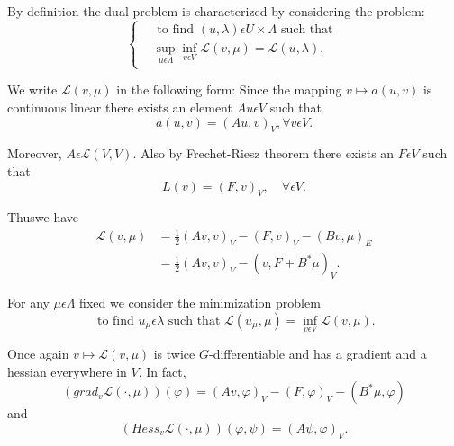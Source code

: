 \medskip
{} By definition the dual problem is characterized by considering the problem:
\begin{equation*}
\begin{cases}
& \text{ to find } (u, \lambda) \epsilon U \times \Lambda \text{ such that }\\
& \sup_{\mu \epsilon \Lambda} \inf_{v \epsilon V} \mathscr{L} (v, \mu) = \mathscr{L}(u, \lambda).\tag{4.13}\label{chap5-eq4.13}
\end{cases}
\end{equation*}

We write $\mathscr{L}(v, \mu)$ in the following form: Since the mapping $v \mapsto a(u, v)$ is continuous linear there exists an element $Au \epsilon V$ such that
$$
a(u, v) = (Au, v)_{V}, \forall v \epsilon V.
$$

Moreover, $A \epsilon \mathscr{L} (V, V)$. Also by Frechet-Riesz theorem there exists an $F \epsilon V$ such that
$$
L(v) = (F, v)_{V}, \quad \forall \epsilon V.
$$

Thus\pageoriginale we have
\begin{align*}
\mathscr{L} (v, \mu) & = \frac{1}{2} (Av, v)_{V} - (F, v)_{V} - (Bv, \mu)_{E}\\
& = \frac{1}{2} (Av, v)_{V} - (v, F + B^{*} \mu)_{V}.
\end{align*}

For any $\mu \epsilon \Lambda$ fixed we consider the minimization problem
\begin{equation*}
\text{ to find } u_{\mu} \epsilon \lambda \text{ such that } \mathscr{L} (u_{\mu}, \mu) = \inf_{v \epsilon V} \mathscr{L} (v, \mu).\tag{4.14}\label{chap5-eq4.14}
\end{equation*}

Once again $v \mapsto \mathscr{L} (v, \mu)$ is twice $G$-differentiable and has a gradient and a hessian everywhere in $V$. In fact,
\begin{equation*}
(grad_{v} \mathscr{L} (\cdot , \mu)) (\varphi) = (Av,\varphi)_{V} - (F, \varphi)_{V} - (B^{*} \mu, \varphi)\tag{4.15}\label{chap5-eq4.15}
\end{equation*}
and
$$
(Hess_{v} \mathscr{L} (\cdot , \mu))(\varphi, \psi) = (A \psi, \varphi)_{V}.
$$

